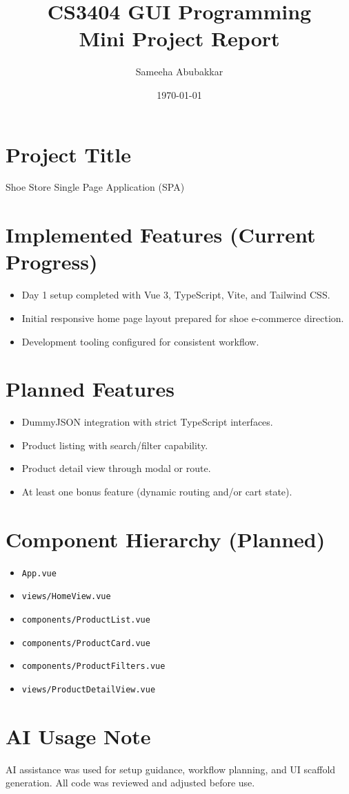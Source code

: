 \documentclass[12pt,a4paper]{article}
\title{CS3404 GUI Programming\\Mini Project Report}
\author{Sameeha Abubakkar}
\date{\today}
\begin{document}
\maketitle

\section{Project Title}
Shoe Store Single Page Application (SPA)

\section{Implemented Features (Current Progress)}
\begin{itemize}[leftmargin=*]
  \item Day 1 setup completed with Vue 3, TypeScript, Vite, and Tailwind CSS.
  \item Initial responsive home page layout prepared for shoe e-commerce direction.
  \item Development tooling configured for consistent workflow.
\end{itemize}

\section{Planned Features}
\begin{itemize}[leftmargin=*]
  \item DummyJSON integration with strict TypeScript interfaces.
  \item Product listing with search/filter capability.
  \item Product detail view through modal or route.
  \item At least one bonus feature (dynamic routing and/or cart state).
\end{itemize}

\section{Component Hierarchy (Planned)}
\begin{itemize}[leftmargin=*]
  \item \texttt{App.vue}
  \item \texttt{views/HomeView.vue}
  \item \texttt{components/ProductList.vue}
  \item \texttt{components/ProductCard.vue}
  \item \texttt{components/ProductFilters.vue}
  \item \texttt{views/ProductDetailView.vue}
\end{itemize}

\section{AI Usage Note}
AI assistance was used for setup guidance, workflow planning, and UI scaffold generation. All code was reviewed and adjusted before use.
\end{document}
